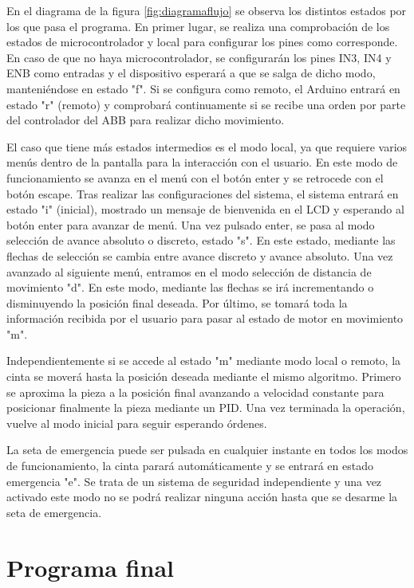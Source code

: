 En el diagrama de la figura \ref{fig:diagramaflujo} se observa los distintos estados por los que pasa el 
programa. En primer lugar, se realiza una comprobación de los estados de microcontrolador y local para 
configurar los pines como corresponde. En caso de que no haya microcontrolador, se configurarán los pines
IN3, IN4 y ENB como entradas y el dispositivo esperará a que se salga de dicho modo, manteniéndose en estado 
"f". Si se configura como remoto, el Arduino entrará en estado "r" (remoto) y comprobará continuamente si se
recibe una orden por parte del controlador del ABB para realizar dicho movimiento.

El caso que tiene más estados intermedios es el modo local, ya que requiere varios menús dentro de la pantalla
para la interacción con el usuario. En este modo de funcionamiento se avanza en el menú con el botón enter y se
retrocede con el botón escape. Tras realizar las configuraciones del sistema, el sistema entrará en estado 
"i" (inicial), mostrado un mensaje de bienvenida en el LCD y esperando al botón enter para avanzar de menú. Una 
vez pulsado enter, se pasa al modo selección de avance absoluto o discreto, estado "s". En este estado, mediante
las flechas de selección se cambia entre avance discreto y avance absoluto. Una vez avanzado al siguiente menú, 
entramos en el modo selección de distancia de movimiento "d". En este modo, mediante las flechas se irá incrementando
o disminuyendo la posición final deseada. Por último, se tomará toda la información recibida por el usuario para 
pasar al estado de motor en movimiento "m".

Independientemente si se accede al estado "m" mediante modo local o remoto, la cinta se moverá hasta la posición 
deseada mediante el mismo algoritmo. Primero se aproxima la pieza a la posición final avanzando a velocidad constante
para posicionar finalmente la pieza mediante un PID. Una vez terminada la operación, vuelve al modo inicial para 
seguir esperando órdenes.

La seta de emergencia puede ser pulsada en cualquier instante en todos los modos de funcionamiento, la cinta parará 
automáticamente y se entrará en estado emergencia "e". 
Se trata de un sistema de seguridad independiente y una vez activado este modo no se podrá realizar ninguna acción 
hasta que se desarme la seta de emergencia.

\section{Programa final}

